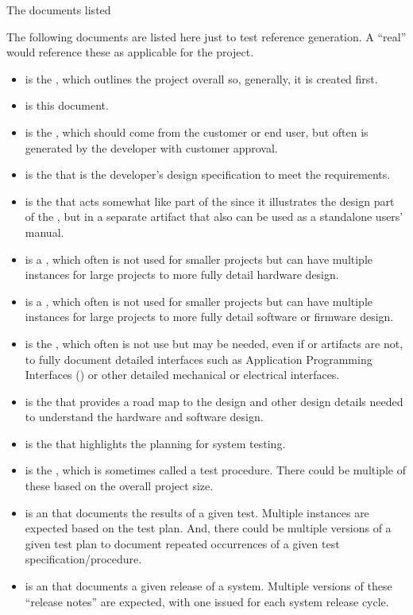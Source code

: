 {The documents listed 

The following documents are listed here just to test reference generation.
A ``real'' \SDP would reference these as applicable for the project.
\begin{itemize}
	\item \citeExProjOCD is the \OCD, which outlines the project overall so, generally, it is created first.
	\item \citeExProjSDP is this document.
	\item \citeExProjSPS is the \SPS, which should come from the customer or end user, but often is generated by the developer with customer approval.
	\item \citeExProjSSS is the \SSS that is the developer's design specification to meet the \SPS requirements.
	\item \citeExProjSUM is the \SUM that acts somewhat like part of the \SSS since it illustrates the \UI design part of the \SSS, but in a separate artifact that also can be used as a standalone users' manual.
	\item \citeExProjHRS is a \HRS, which often is not used for smaller projects but can have multiple instances for large projects to more fully detail hardware design.	
	\item \citeExProjSRS is a \SRS, which often is not used for smaller projects but can have multiple instances for large projects to more fully detail software or firmware design.
	\item \citeExProjIRS is the \IRS, which often is not use but may be needed, even if \HRS or \SRS artifacts are not, to fully document detailed interfaces such as Application Programming Interfaces (\APIs) or other detailed mechanical or electrical interfaces.
	\item \citeExProjSSDD is the \SSDD that provides a road map to the design and other design details needed to understand the hardware and software design.
	\item \citeExProjSTP is the \STP that highlights the planning for system testing.
	\item \citeExProjSTS is the \STS, which is sometimes called a test procedure. There could be multiple of these based on the overall project size.
	\item \citeExProjSTR is an \STR that documents the results of a given test. Multiple instances are expected based on the test plan. And, there could be multiple versions of a given test plan to document repeated occurrences of a given test specification/procedure.
	\item \citeExProjSVD is an \SVD that documents a given release of a system. Multiple versions of these ``release notes'' are expected, with one \SVD issued for each system release cycle.


\end{itemize}}
